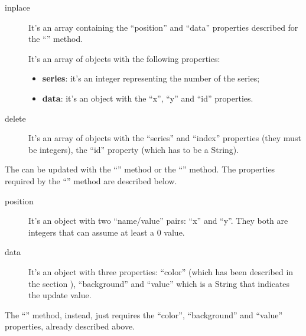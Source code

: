 		\begin{description}
			\item[inplace] It's an array containing the “position” and “data” properties described for the “” method.
			\item[] It's an array of objects with the following properties:
			\begin{itemize}
				\item \textbf{series}: it's an integer representing the number of the series;
				\item \textbf{data}: it's an object with the “x”, “y” and “id” properties.
			\end{itemize}
			\item[delete] It's an array of objects with the “series” and “index” properties (they must be integers), the “id” property (which has to be a String).
		\end{description}
		The  can be updated with the “” method or the “” method.
		The properties required by the “” method are described below.
		\begin{description}
			\item[position] It's an object with two “name/value” pairs: “x” and “y”. They both are integers that can assume at least a 0 value.
			\item[data] It's an object with three properties: “color” (which has been described in the section ), “background” and “value” which is a String that indicates the update value.
		\end{description}
		The “” method, instead, just requires the “color”, “background” and “value” properties, already described above.